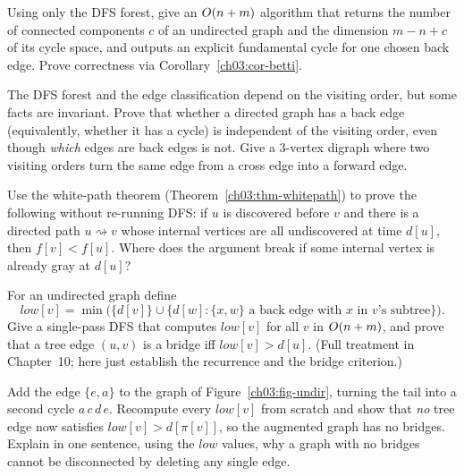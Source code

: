 \begin{exercise}\label{ch03:ex-betti}
Using only the DFS forest, give an $O(n+m)$ algorithm that returns the number of connected components $c$ of an undirected graph and the dimension $m-n+c$ of its cycle space, and outputs an explicit fundamental cycle for one chosen back edge. Prove correctness via Corollary~\ref{ch03:cor-betti}.
\end{exercise}

\begin{exercise}\label{ch03:ex-order}
The DFS forest and the edge classification depend on the visiting order, but some facts are invariant. Prove that whether a directed graph has a back edge (equivalently, whether it has a cycle) is independent of the visiting order, even though \emph{which} edges are back edges is not. Give a 3-vertex digraph where two visiting orders turn the same edge from a cross edge into a forward edge.
\end{exercise}

\begin{exercise}\label{ch03:ex-whitepath}
Use the white-path theorem (Theorem~\ref{ch03:thm-whitepath}) to prove the following without re-running DFS: if $u$ is discovered before $v$ and there is a directed path $u\rightsquigarrow v$ whose internal vertices are all undiscovered at time $d[u]$, then $f[v]<f[u]$. Where does the argument break if some internal vertex is already gray at $d[u]$?
\end{exercise}

\begin{exercise}\label{ch03:ex-low}
For an undirected graph define
\[
  \mathit{low}[v]=\min\bigl(\{d[v]\}\cup\{d[w] : \{x,w\}\text{ a back edge with }x\text{ in }v\text{'s subtree}\}\bigr).
\] Give a single-pass DFS that computes $\mathit{low}[v]$ for all $v$ in $O(n+m)$, and prove that a tree edge $(u,v)$ is a bridge iff $\mathit{low}[v]>d[u]$. (Full treatment in Chapter~10; here just establish the recurrence and the bridge criterion.)
\end{exercise}

\begin{exercise}\label{ch03:ex-bridges}
Add the edge $\{e,a\}$ to the graph of Figure~\ref{ch03:fig-undir}, turning the tail into a second cycle $a\,c\,d\,e$. Recompute every $\mathit{low}[v]$ from scratch and show that \emph{no} tree edge now satisfies $\mathit{low}[v]>d[\pi[v]]$, so the augmented graph has no bridges. Explain in one sentence, using the $\mathit{low}$ values, why a graph with no bridges cannot be disconnected by deleting any single edge.
\end{exercise}

